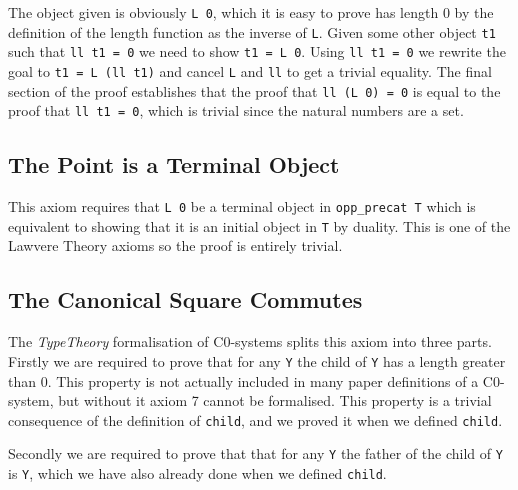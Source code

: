 The object given is obviously \lstinline|L 0|, which it is easy to prove has length 0
by the definition of the length function as the inverse of \lstinline|L|. Given some
other object \lstinline|t1| such that \lstinline|ll t1 = 0| we need to show 
\lstinline|t1 = L 0|. Using \lstinline|ll t1 = 0| we rewrite the goal to 
\lstinline|t1 = L (ll t1)| and cancel \lstinline|L| and \lstinline|ll| to get a trivial 
equality. The final section of the proof establishes that the proof that 
\lstinline|ll (L 0) = 0| is equal to the proof that \lstinline|ll t1 = 0|, which is 
trivial since the natural numbers are a set.

\subsection{The Point is a Terminal Object}
This axiom requires that \lstinline|L 0| be a terminal object in \lstinline|opp_precat T|
which is equivalent to showing that it is an initial object in \lstinline|T| by
duality. This is one of the Lawvere Theory axioms so the proof is entirely
trivial.

\subsection{The Canonical Square Commutes}
The \textit{TypeTheory} formalisation of C0-systems splits this axiom into three
parts. Firstly we are required to prove that for any \lstinline|Y| the child of
\lstinline|Y| has a length greater than 0. This property is not actually included in
many paper definitions of a C0-system, but without it axiom 7 cannot be
formalised. This property is a trivial consequence of the definition of
\lstinline|child|, and we proved it when we defined \lstinline|child|.

Secondly we are required to prove that that for any \lstinline|Y| the father of the
child of \lstinline|Y| is \lstinline|Y|, which we have also already done when we defined
\lstinline|child|.

